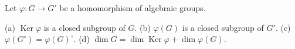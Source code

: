 Let $\varphi: G \rightarrow G'$ be a homomorphism of algebraic groups.

(a) $\operatorname{Ker} \varphi$ is a closed subgroup of $G$.
(b) $\varphi(G)$ is a closed subgroup of $G'$.
(c) $\varphi(G^\circ) = \varphi(G)^\circ$.
(d) $\dim G = \dim \operatorname{Ker} \varphi + \dim \varphi(G)$.
